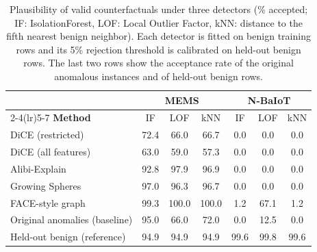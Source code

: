 \begin{table}[t]
\centering
\caption{Plausibility of valid counterfactuals under three detectors (\% accepted; IF: IsolationForest, LOF: Local Outlier Factor, kNN: distance to the fifth nearest benign neighbor). Each detector is fitted on benign training rows and its 5\% rejection threshold is calibrated on held-out benign rows. The last two rows show the acceptance rate of the original anomalous instances and of held-out benign rows.}
\label{tab:ext-plaus}
\scriptsize
\setlength{\tabcolsep}{2.6pt}
\begin{tabular}{@{}l ccc ccc@{}}
\toprule
 & \multicolumn{3}{c}{\textbf{MEMS}} & \multicolumn{3}{c}{\textbf{N-BaIoT}} \\
\cmidrule(lr){2-4}\cmidrule(lr){5-7}
\textbf{Method} & IF & LOF & kNN & IF & LOF & kNN \\
\midrule
DiCE (restricted) & 72.4 & 66.0 & 66.7 & 0.0 & 0.0 & 0.0 \\
DiCE (all features) & 63.0 & 59.0 & 57.3 & 0.0 & 0.0 & 0.0 \\
Alibi-Explain & 92.8 & 97.9 & 96.9 & 0.0 & 0.0 & 0.0 \\
Growing Spheres & 97.0 & 96.3 & 96.7 & 0.0 & 0.0 & 0.0 \\
FACE-style graph & 99.3 & 100.0 & 100.0 & 1.2 & 67.1 & 1.2 \\
\midrule
Original anomalies (baseline) & 95.0 & 66.0 & 72.0 & 0.0 & 12.5 & 0.0 \\
Held-out benign (reference) & 94.9 & 94.9 & 94.9 & 99.6 & 99.8 & 99.6 \\
\bottomrule
\end{tabular}
\end{table}
